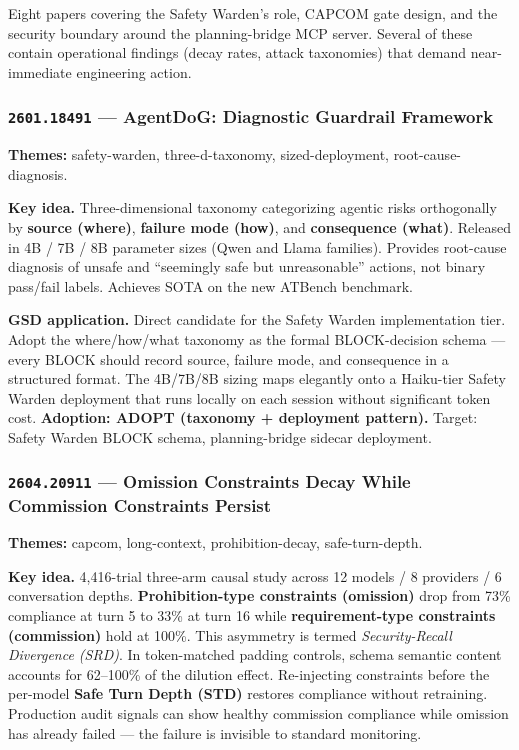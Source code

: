\documentclass[11pt,letterpaper]{article}
\newcommand{\arxivid}[1]{\texttt{\textcolor{accent}{#1}}}
\newcommand{\paperhead}[2]{\noindent\textbf{\sffamily\textcolor{secondary}{#1}} \textemdash{} #2}
\begin{document}
Eight papers covering the Safety Warden's role, CAPCOM gate design, and the security boundary around the planning-bridge MCP server. Several of these contain operational findings (decay rates, attack taxonomies) that demand near-immediate engineering action.

\subsubsection{\arxivid{2601.18491} --- AgentDoG: Diagnostic Guardrail Framework}

\paperhead{Themes:}{safety-warden, three-d-taxonomy, sized-deployment, root-cause-diagnosis.}

\textbf{Key idea.} Three-dimensional taxonomy categorizing agentic risks orthogonally by \textbf{source (where)}, \textbf{failure mode (how)}, and \textbf{consequence (what)}. Released in 4B / 7B / 8B parameter sizes (Qwen and Llama families). Provides root-cause diagnosis of unsafe and ``seemingly safe but unreasonable'' actions, not binary pass/fail labels. Achieves SOTA on the new ATBench benchmark.

\textbf{GSD application.} Direct candidate for the Safety Warden implementation tier. Adopt the where/how/what taxonomy as the formal BLOCK-decision schema --- every BLOCK should record source, failure mode, and consequence in a structured format. The 4B/7B/8B sizing maps elegantly onto a Haiku-tier Safety Warden deployment that runs locally on each session without significant token cost. \textbf{Adoption: ADOPT (taxonomy + deployment pattern).} Target: Safety Warden BLOCK schema, planning-bridge sidecar deployment.

\subsubsection{\arxivid{2604.20911} --- Omission Constraints Decay While Commission Constraints Persist}

\paperhead{Themes:}{capcom, long-context, prohibition-decay, safe-turn-depth.}

\textbf{Key idea.} 4,416-trial three-arm causal study across 12 models / 8 providers / 6 conversation depths. \textbf{Prohibition-type constraints (omission)} drop from 73\% compliance at turn 5 to 33\% at turn 16 while \textbf{requirement-type constraints (commission)} hold at 100\%. This asymmetry is termed \textit{Security-Recall Divergence (SRD)}. In token-matched padding controls, schema semantic content accounts for 62--100\% of the dilution effect. Re-injecting constraints before the per-model \textbf{Safe Turn Depth (STD)} restores compliance without retraining. Production audit signals can show healthy commission compliance while omission has already failed --- the failure is invisible to standard monitoring.
\end{document}
